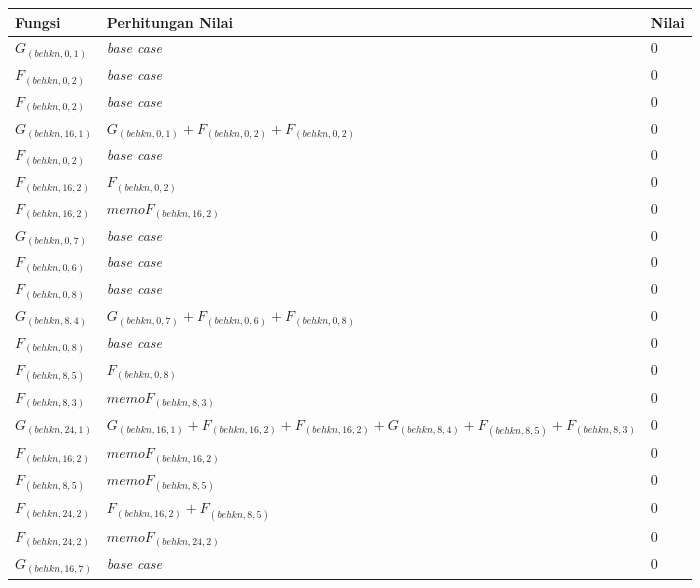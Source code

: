 \begin{appendices}
  \begin{table}[H]
  	\centering
  	\begin{tabular} {|p{3cm}|p{5cm}|p{1cm}|} \hline
  		Fungsi & Perhitungan Nilai & Nilai \\ \hline
  		$ G_{(behkn, 0, 1)} $ & \textit{base case} & $ 0 $ \\ \hline
  		$ F_{(behkn, 0, 2)} $ & \textit{base case} & $ 0 $ \\ \hline
  		$ F_{(behkn, 0, 2)} $ & \textit{base case} & $ 0 $ \\ \hline
  		$ G_{(behkn, 16, 1)}  $ & $G_{(behkn, 0, 1)} + F_{(behkn, 0, 2)} + F_{(behkn, 0, 2)}$ & $ 0 $ \\ \hline
  		$ F_{(behkn, 0, 2)} $ & \textit{base case} & $ 0 $ \\ \hline
  		$ F_{(behkn, 16, 2)}  $ & $F_{(behkn, 0, 2)}$ & $ 0 $ \\ \hline
  		$ F_{(behkn, 16, 2)}  $ & $memoF_{(behkn, 16, 2)}$ & $ 0 $ \\ \hline
  		$ G_{(behkn, 0, 7)} $ & \textit{base case} & $ 0 $ \\ \hline
  		$ F_{(behkn, 0, 6)} $ & \textit{base case} & $ 0 $ \\ \hline
  		$ F_{(behkn, 0, 8)} $ & \textit{base case} & $ 0 $ \\ \hline
  		$ G_{(behkn, 8, 4)}  $ & $G_{(behkn, 0, 7)} + F_{(behkn, 0, 6)} + F_{(behkn, 0, 8)}$ & $ 0 $ \\ \hline
  		$ F_{(behkn, 0, 8)} $ & \textit{base case} & $ 0 $ \\ \hline
  		$ F_{(behkn, 8, 5)}  $ & $F_{(behkn, 0, 8)}$ & $ 0 $ \\ \hline
  		$ F_{(behkn, 8, 3)}  $ & $memoF_{(behkn, 8, 3)}$ & $ 0 $ \\ \hline
  		$ G_{(behkn, 24, 1)}  $ & $G_{(behkn, 16, 1)} + F_{(behkn, 16, 2)} + F_{(behkn, 16, 2)} + G_{(behkn, 8, 4)} + F_{(behkn, 8, 5)} + F_{(behkn, 8, 3)}$ & $ 0 $ \\ \hline
  		$ F_{(behkn, 16, 2)}  $ & $memoF_{(behkn, 16, 2)}$ & $ 0 $ \\ \hline
  		$ F_{(behkn, 8, 5)}  $ & $memoF_{(behkn, 8, 5)}$ & $ 0 $ \\ \hline
  		$ F_{(behkn, 24, 2)}  $ & $F_{(behkn, 16, 2)} + F_{(behkn, 8, 5)}$ & $ 0 $ \\ \hline
  		$ F_{(behkn, 24, 2)}  $ & $memoF_{(behkn, 24, 2)}$ & $ 0 $ \\ \hline
  		$ G_{(behkn, 16, 7)} $ & \textit{base case} & $ 0 $ \\ \hline

\end{tabular}
\end{table}
\end{appendices}
